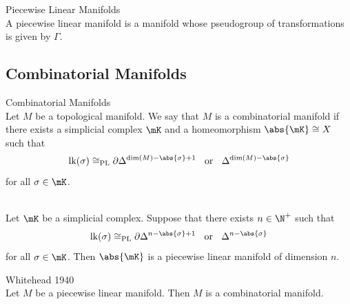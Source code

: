 \documentclass[a4paper]{article}
\begin{document}
\begin{defn}{Piecewise Linear Manifolds}{}\\
A piecewise linear manifold is a manifold whose pseudogroup of transformations is given by $\Gamma$. 
\end{defn}

\subsection{Combinatorial Manifolds}
\begin{defn}{Combinatorial Manifolds}{}\\
Let $M$ be a topological manifold. We say that $M$ is a combinatorial manifold if there exists a simplicial complex $\mK$ and a homeomorphism $\abs{\mK}\cong X$ such that $$\text{lk}(\sigma)\cong_\text{PL}\partial\Delta^{\dim(M)-\abs{\sigma}+1}\;\;\text{ or }\;\;\Delta^{\dim(M)-\abs{\sigma}}$$ for all $\sigma\in\mK$. 
\end{defn}

\begin{lmm}{}{}\\
Let $\mK$ be a simplicial complex. Suppose that there exists $n\in\N^+$ such that $$\text{lk}(\sigma)\cong_\text{PL}\partial\Delta^{n-\abs{\sigma}+1}\;\;\text{ or }\;\;\Delta^{n-\abs{\sigma}}$$ for all $\sigma\in\mK$. Then $\abs{\mK}$ is a piecewise linear manifold of dimension $n$. 
\end{lmm}

\begin{thm}{Whitehead 1940}{}\\
Let $M$ be a piecewise linear manifold. Then $M$ is a combinatorial manifold. 
\end{thm}

\\
\end{document}

